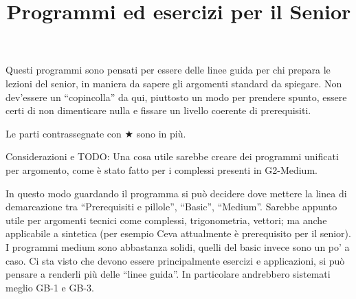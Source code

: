 \documentclass[a4paper,10pt]{article}
\title{Programmi ed esercizi per il Senior}
\date{}
\begin{document}
\maketitle

Questi programmi sono pensati per essere delle linee guida per chi prepara le lezioni del senior, in maniera da sapere gli argomenti standard da spiegare. Non dev'essere un ``copincolla'' da qui, piuttosto un modo per prendere spunto, essere certi di non dimenticare nulla e fissare un livello coerente di prerequisiti.

\bigskip

Le parti contrassegnate con $\bigstar$ sono in più.

\vspace{0.7cm}
Considerazioni e TODO: Una cosa utile sarebbe creare dei programmi unificati per argomento, come è stato fatto per i complessi presenti in G2-Medium. 

In questo modo guardando il programma si può decidere dove mettere la linea di demarcazione tra ``Prerequisiti e pillole'', ``Basic'', ``Medium''. Sarebbe appunto utile per argomenti tecnici come complessi, trigonometria, vettori; ma anche applicabile a sintetica (per esempio Ceva attualmente è prerequisito per il senior).\\

I programmi medium sono abbastanza solidi, quelli del basic invece sono un po' a caso. Ci sta visto che devono essere principalmente esercizi e applicazioni, si può pensare a renderli più delle ``linee guida''. In particolare andrebbero sistemati meglio GB-1 e GB-3.


\clearpage


\clearpage


\clearpage


\clearpage


\clearpage


 \clearpage
 

\clearpage
\end{document}
